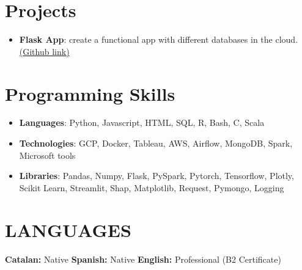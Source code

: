 \documentclass[letterpaper,11pt]{article}
\newcommand{\resumeSubHeadingListStart}{\begin{itemize}[leftmargin=*]}
\newcommand{\resumeSubHeadingListEnd}{\end{itemize}}
\newcommand{\resumeItemListEnd}{\end{itemize}\vspace{-2pt}}
\begin{document}
{%

\section{Projects}
 \resumeSubHeadingListStart
    \item{\textbf{Flask App}{: create a functional app with different databases in the cloud. \href{https://github.com/puchee99/Flask-App}{(Github link)} }
    }
 \resumeSubHeadingListEnd

\section{Programming Skills}
 \resumeSubHeadingListStart
    \item{\textbf{Languages}{:  Python, Javascript, HTML, SQL, R, Bash, C, Scala}
    }
    \item{\textbf{Technologies}{: GCP, Docker, Tableau, AWS, Airflow, MongoDB, Spark, Microsoft tools}
    }
    \item{\textbf{Libraries}{: Pandas, Numpy, Flask, PySpark, Pytorch, Tensorflow, Plotly, Scikit Learn, Streamlit, Shap, Matplotlib, Request, Pymongo, Logging}
    }
 \resumeSubHeadingListEnd



\section{LANGUAGES}
    \textbf{Catalan:}{ Native}\hspace{22mm}
    \textbf{Spanish:}{ Native}\hspace{22mm}
    \textbf{English:}{ Professional (B2 Certificate)}

}
\vspace{5mm}



\end{document}
